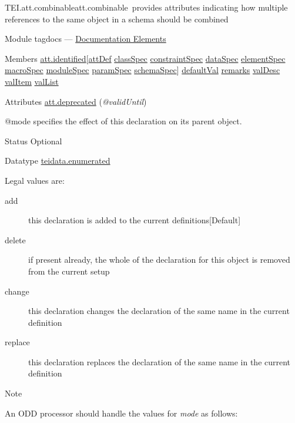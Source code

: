 \begin{reflist}
\item[]\begin{specHead}{TEI.att.combinable}{att.combinable} provides attributes indicating how multiple references to the same object in a schema should be combined\end{specHead} 
    \item[{Module}]
  tagdocs — \hyperref[TD]{Documentation Elements}
    \item[{Members}]
  \hyperref[TEI.att.identified]{att.identified}[\hyperref[TEI.attDef]{attDef} \hyperref[TEI.classSpec]{classSpec} \hyperref[TEI.constraintSpec]{constraintSpec} \hyperref[TEI.dataSpec]{dataSpec} \hyperref[TEI.elementSpec]{elementSpec} \hyperref[TEI.macroSpec]{macroSpec} \hyperref[TEI.moduleSpec]{moduleSpec} \hyperref[TEI.paramSpec]{paramSpec} \hyperref[TEI.schemaSpec]{schemaSpec}] \hyperref[TEI.defaultVal]{defaultVal} \hyperref[TEI.remarks]{remarks} \hyperref[TEI.valDesc]{valDesc} \hyperref[TEI.valItem]{valItem} \hyperref[TEI.valList]{valList}
    \item[{Attributes}]
  \hyperref[TEI.att.deprecated]{att.deprecated} (\textit{@validUntil}) \hfil\\[-10pt]\begin{sansreflist}
    \item[@mode]
  specifies the effect of this declaration on its parent object.
\begin{reflist}
    \item[{Status}]
  Optional
    \item[{Datatype}]
  \hyperref[TEI.teidata.enumerated]{teidata.enumerated}
    \item[{Legal values are:}]
  \begin{description}

\item[{add}]this declaration is added to the current definitions{[Default] }
\item[{delete}]if present already, the whole of the declaration for this object is removed from the current setup
\item[{change}]this declaration changes the declaration of the same name in the current definition
\item[{replace}]this declaration replaces the declaration of the same name in the current definition
\end{description} 
\end{reflist}  
\end{sansreflist}  
    \item[{Note}]
  \par
An ODD processor should handle the values for {\itshape mode} as follows: \begin{description}


\end{description}
\end{reflist}
